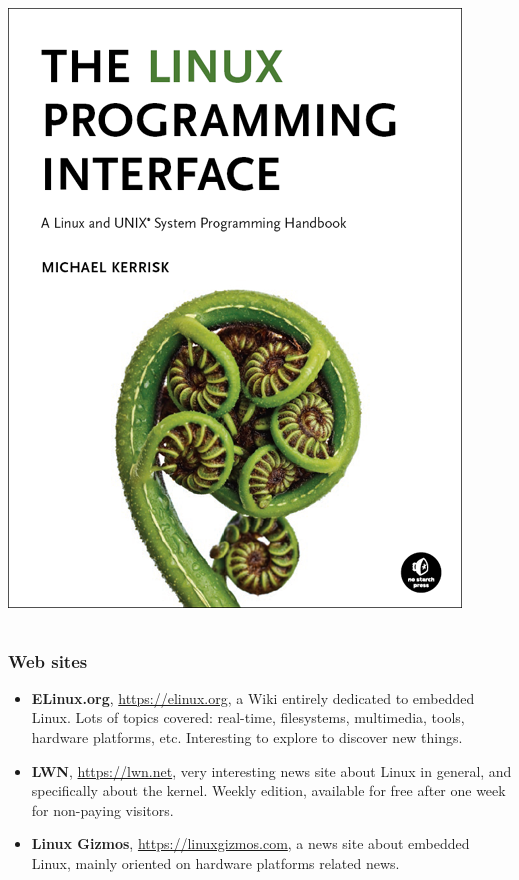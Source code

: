 \begin{frame}
\begin{columns}
    \vspace{0.5cm}
    \includegraphics[height=0.25\textheight]{common/linux-programming-interface.png}\\
  \end{columns}
\end{frame}

\begin{frame}
  \frametitle{Web sites}
  \begin{itemize}
  \item {\bf ELinux.org}, \url{https://elinux.org}, a Wiki entirely
    dedicated to embedded Linux. Lots of topics covered: real-time,
    filesystems, multimedia, tools, hardware platforms,
    etc. Interesting to explore to discover new things.
  \item {\bf LWN}, \url{https://lwn.net}, very interesting news site
    about Linux in general, and specifically about the kernel. Weekly
    edition, available for free after one week for non-paying
    visitors.
  \item {\bf Linux Gizmos}, \url{https://linuxgizmos.com}, a news site
    about embedded Linux, mainly oriented on hardware platforms
    related news.
  \end{itemize}
\end{frame}

